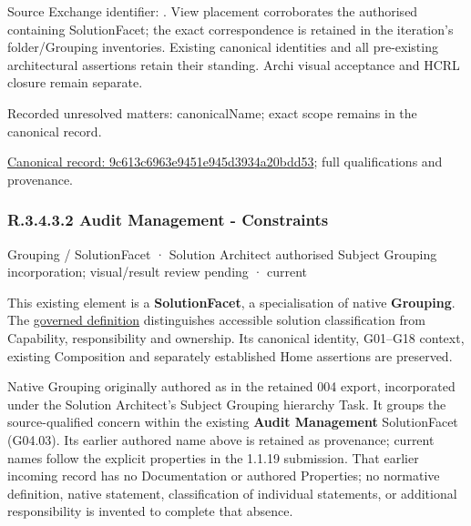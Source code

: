 Source Exchange identifier: \texttt{}. View placement corroborates
the authorised containing SolutionFacet; the exact correspondence is retained in the
iteration's folder/Grouping inventories. Existing canonical identities and all
pre-existing architectural assertions retain their standing. Archi visual
acceptance and HCRL closure remain separate.


{\small Recorded unresolved matters: canonicalName; exact scope remains in the canonical record.}\par
{\footnotesize \href{../../../../../../../continuum/grouping/9c613c6963e9451e945d3934a20bdd53.md}{Canonical record: 9c613c6963e9451e945d3934a20bdd53}; full qualifications and provenance.}\par
\subsubsection*{R.3.4.3.2 Audit Management - Constraints}
\label{navigation:R.3.4.3.2}

\label{element:c18ef04adb54413d89bd9434a344504f}
{\small Grouping / SolutionFacet · Solution Architect authorised Subject Grouping incorporation; visual/result review pending · current}\par

This existing element is a \textbf{SolutionFacet}, a specialisation of native
\textbf{Grouping}. The \href{\detokenize{../../../../../../../governance/continuum-representation.md#solutionfacet-classification--1119-candidate}}{governed definition}
distinguishes accessible solution classification from Capability, responsibility
and ownership. Its canonical identity, G01–G18 context, existing Composition
and separately established Home assertions are preserved.



Native Grouping originally authored as \texttt{} in the retained 004 export,
incorporated under the Solution Architect's Subject Grouping hierarchy Task.
It groups the source-qualified \texttt{} concern within
the existing \textbf{Audit Management} SolutionFacet (G04.03). Its earlier authored name above is retained as provenance; current names
follow the explicit properties in the 1.1.19 submission.
That earlier incoming record has no Documentation or authored Properties; no normative
definition, native statement, classification of individual statements, or
additional responsibility is invented to complete that absence.



